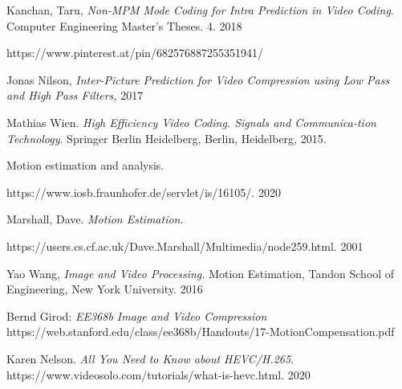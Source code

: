 \documentclass[10pt,journal,compsoc]{IEEEtran}
\begin{document}
\begin{thebibliography}{9}
Kanchan, Taru, 
\textit{Non-MPM Mode Coding for Intra Prediction in Video Coding}. Computer Engineering Master's Theses. 4. 2018


https://www.pinterest.at/pin/682576887255351941/


Jonas Nilson,
\textit{Inter-Picture Prediction for Video Compression using Low Pass and High Pass Filters,} 2017

Mathias Wien.
\textit{High Efficiency Video Coding. Signals and Communica-tion Technology}. Springer Berlin Heidelberg, Berlin, Heidelberg, 2015.


Motion estimation and analysis.

https://www.iosb.fraunhofer.de/servlet/is/16105/. 2020

Marshall, Dave.
\textit{Motion Estimation}.

https://users.cs.cf.ac.uk/Dave.Marshall/Multimedia/node259.html. 2001
 

Yao Wang, \textit{Image and Video Processing.} Motion Estimation, Tandon School of Engineering, New York University. 2016


Bernd Girod: \textit{EE368b Image and Video Compression} https://web.stanford.edu/class/ee368b/Handouts/17-MotionCompensation.pdf


Karen Nelson. \textit{All You Need to Know about HEVC/H.265}. https://www.videosolo.com/tutorials/what-is-hevc.html. 2020

\end{thebibliography}
\end{document}
